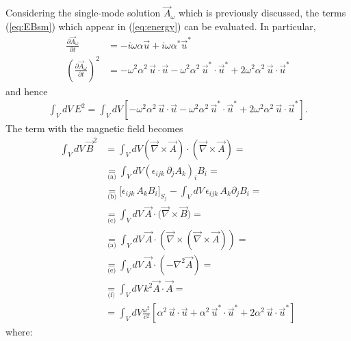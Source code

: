Considering the single-mode solution $\Vec{A}_\omega$ which is previously discussed, the terms (\ref{eq:EBsm}) which appear in (\ref{eq:energy}) can be evaluated. In particular, 
\begin{align*}
    \frac{\partial \vec{A}_\omega}{\partial t} &= -i\omega\alpha \Vec{u} +i\omega \alpha^* \Vec{u}^* \\
    \left( \frac{\partial \vec{A}_\omega}{\partial t} \right)^2 &= - \omega^2 \alpha^2 \, \vec{u}\cdot \vec{u} - \omega^2 \alpha^{2} \, \vec{u}^*\cdot \vec{u}^* + 2 \omega^2 \alpha^2 \, \vec{u}\cdot \vec{u}^* 
\end{align*}
and hence
\begin{align*}
    \int_V dV \, E^2 = \int_V dV \left[ - \omega^2 \alpha^2 \, \vec{u}\cdot \vec{u} - \omega^2 \alpha^{2} \, \vec{u}^*\cdot \vec{u}^* + 2 \omega^2 \alpha^2 \, \vec{u}\cdot \vec{u}^* \right]. 
\end{align*}
The term with the magnetic field becomes
\begin{equation*}
    \begin{aligned}
        \int_{V}{dV \, \Vec{B}^{2}} &= \int_{V}dV (\Vec{\nabla}\times\Vec{A})\cdot (\Vec{\nabla}\times\Vec{A}) = \\
        &\underset{\text{(a)}}{=} \int_{V}{dV (\epsilon_{ijk} \, \partial_{j}A_{k})_i B_{i}} = \\ 
        &\underset{\text{(b)}}{=} \bigg[\epsilon_{ijk}\,A_{k}B_{i}\bigg]_{S_j}-\int_{V}{dV \, \epsilon_{ijk}\, A_{k}\partial_{j}B_{i}} = \\
        &\underset{\text{(c)}}{=} \int_{V}{dV\,\Vec{A}\cdot(\Vec{\nabla}\times\Vec{B}}) = \\
        &\underset{\text{(a)}}{=}
        \int_{V}{dV\,\Vec{A} \cdot (\vec{\nabla}\times(\vec{\nabla}\times\Vec{A}))} = \\
        &\underset{\text{(e)}}{=}
        \int_{V}{dV\,\Vec{A} \cdot (-\nabla^{2}\Vec{A})} = \\
        &\underset{\text{(f)}}{=}
        \int_{V}dV \, k^{2}\Vec{A} \cdot \Vec{A} = \\
        &= \int_{V}dV \frac{\omega^2}{c^2} \left[ \alpha^2 \, \vec{u}\cdot \vec{u} + \alpha^{2} \, \vec{u}^*\cdot \vec{u}^* + 2 \alpha^2 \, \vec{u}\cdot \vec{u}^*  \right]
    \end{aligned}
\end{equation*}
where:
